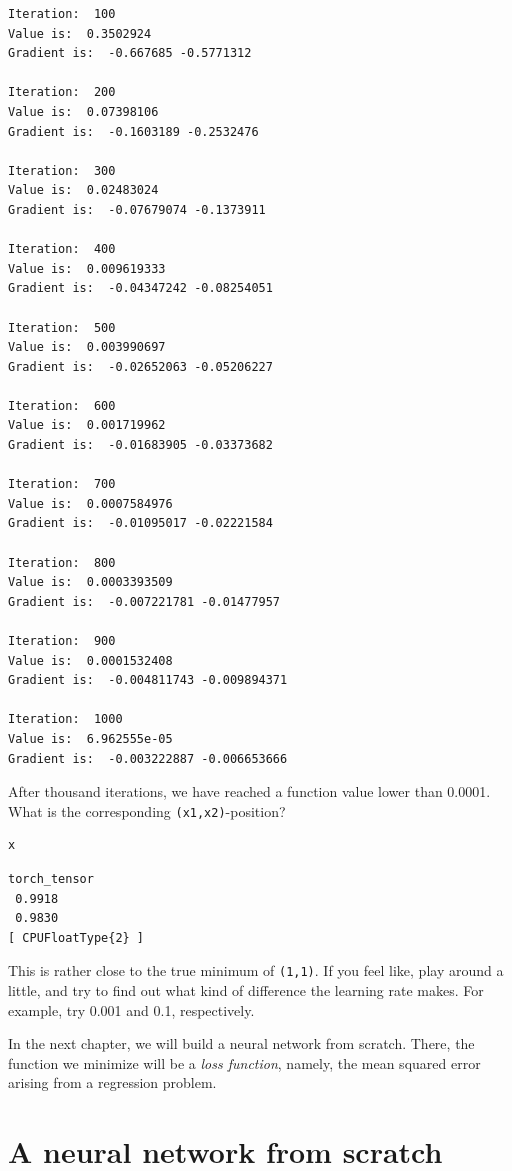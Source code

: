 \documentclass[
  letterpaper,
]{krantz}
\begin{document}
\begin{verbatim}
Iteration:  100 
Value is:  0.3502924 
Gradient is:  -0.667685 -0.5771312 

Iteration:  200 
Value is:  0.07398106 
Gradient is:  -0.1603189 -0.2532476 

Iteration:  300 
Value is:  0.02483024 
Gradient is:  -0.07679074 -0.1373911 

Iteration:  400 
Value is:  0.009619333 
Gradient is:  -0.04347242 -0.08254051 

Iteration:  500 
Value is:  0.003990697 
Gradient is:  -0.02652063 -0.05206227 

Iteration:  600 
Value is:  0.001719962 
Gradient is:  -0.01683905 -0.03373682 

Iteration:  700 
Value is:  0.0007584976 
Gradient is:  -0.01095017 -0.02221584 

Iteration:  800 
Value is:  0.0003393509 
Gradient is:  -0.007221781 -0.01477957

Iteration:  900 
Value is:  0.0001532408 
Gradient is:  -0.004811743 -0.009894371 

Iteration:  1000 
Value is:  6.962555e-05 
Gradient is:  -0.003222887 -0.006653666 
\end{verbatim}

After thousand iterations, we have reached a function value lower than
0.0001. What is the corresponding \texttt{(x1,x2)}-position?

\begin{verbatim}
x
\end{verbatim}

\begin{verbatim}
torch_tensor
 0.9918
 0.9830
[ CPUFloatType{2} ]
\end{verbatim}

This is rather close to the true minimum of \texttt{(1,1)}. If you feel
like, play around a little, and try to find out what kind of difference
the learning rate makes. For example, try 0.001 and 0.1, respectively.

In the next chapter, we will build a neural network from scratch. There,
the function we minimize will be a \emph{loss function}, namely, the
mean squared error arising from a regression problem.

\hypertarget{sec:network-1}{%
\chapter{A neural network from scratch}\label{sec:network-1}}
\end{document}
